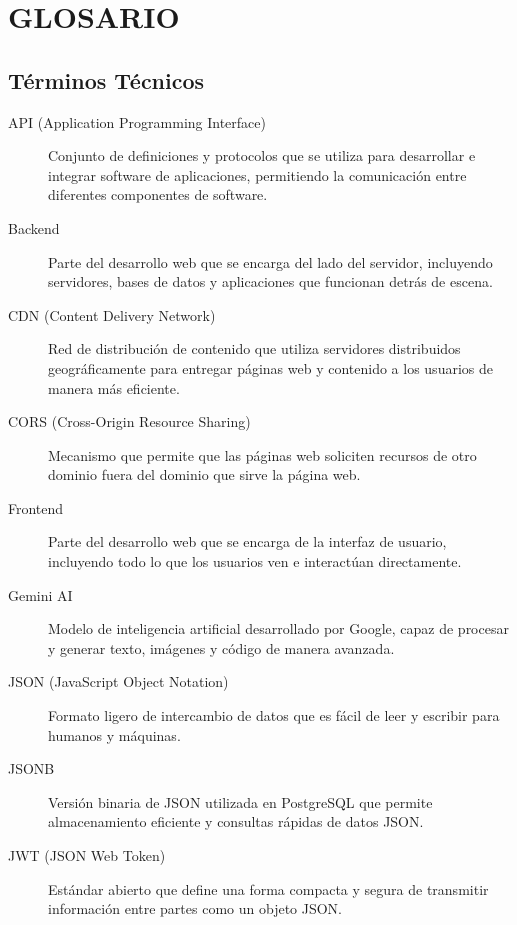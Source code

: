 \documentclass[12pt,a4paper]{report}
\begin{document}
\chapter{GLOSARIO}

\section{Términos Técnicos}

\begin{description}
\item[API (Application Programming Interface)] Conjunto de definiciones y protocolos que se utiliza para desarrollar e integrar software de aplicaciones, permitiendo la comunicación entre diferentes componentes de software.

\item[Backend] Parte del desarrollo web que se encarga del lado del servidor, incluyendo servidores, bases de datos y aplicaciones que funcionan detrás de escena.

\item[CDN (Content Delivery Network)] Red de distribución de contenido que utiliza servidores distribuidos geográficamente para entregar páginas web y contenido a los usuarios de manera más eficiente.

\item[CORS (Cross-Origin Resource Sharing)] Mecanismo que permite que las páginas web soliciten recursos de otro dominio fuera del dominio que sirve la página web.

\item[Frontend] Parte del desarrollo web que se encarga de la interfaz de usuario, incluyendo todo lo que los usuarios ven e interactúan directamente.

\item[Gemini AI] Modelo de inteligencia artificial desarrollado por Google, capaz de procesar y generar texto, imágenes y código de manera avanzada.

\item[JSON (JavaScript Object Notation)] Formato ligero de intercambio de datos que es fácil de leer y escribir para humanos y máquinas.

\item[JSONB] Versión binaria de JSON utilizada en PostgreSQL que permite almacenamiento eficiente y consultas rápidas de datos JSON.

\item[JWT (JSON Web Token)] Estándar abierto que define una forma compacta y segura de transmitir información entre partes como un objeto JSON.


\end{description}
\end{document}
